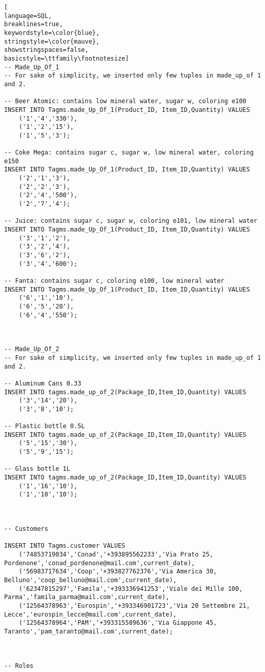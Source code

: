 \begin{lstlisting}[
language=SQL,
breaklines=true,
keywordstyle=\color{blue},
stringstyle=\color{mauve},
showstringspaces=false,
basicstyle=\ttfamily\footnotesize]
-- Made_Up_Of_1
-- For sake of simplicity, we inserted only few tuples in made_up_of 1 and 2.

-- Beer Atomic: contains low mineral water, sugar w, coloring e100
INSERT INTO Tagms.made_Up_Of_1(Product_ID, Item_ID,Quantity) VALUES
    ('1','4','330'),
    ('1','2','15'),
    ('1','5','3');

-- Coke Mega: contains sugar c, sugar w, low mineral water, coloring e150
INSERT INTO Tagms.made_Up_Of_1(Product_ID, Item_ID,Quantity) VALUES
    ('2','1','3'),
    ('2','2','3'),
    ('2','4','500'),
    ('2','7','4');

-- Juice: contains sugar c, sugar w, coloring e101, low mineral water
INSERT INTO Tagms.made_Up_Of_1(Product_ID, Item_ID,Quantity) VALUES
    ('3','1','2'),
    ('3','2','4'),
    ('3','6','2'),
    ('3','4','600');

-- Fanta: contains sugar c, coloring e100, low mineral water
INSERT INTO Tagms.made_Up_Of_1(Product_ID, Item_ID,Quantity) VALUES
    ('6','1','10'),
    ('6','5','20'),
    ('6','4','550');



-- Made_Up_Of_2
-- For sake of simplicity, we inserted only few tuples in made_up_of 1 and 2.

-- Aluminum Cans 0.33
INSERT INTO tagms.made_up_of_2(Package_ID,Item_ID,Quantity) VALUES
    ('3','14','20'),
    ('3','8','10');

-- Plastic bottle 0.5L
INSERT INTO tagms.made_up_of_2(Package_ID,Item_ID,Quantity) VALUES
    ('5','15','30'),
    ('5','9','15');

-- Glass bottle 1L
INSERT INTO tagms.made_up_of_2(Package_ID,Item_ID,Quantity) VALUES
    ('1','16','10'),
    ('1','10','10');



-- Customers

INSERT INTO Tagms.customer VALUES
    ('74853719034','Conad','+393895562233','Via Prato 25, Pordenone','conad_pordenone@mail.com',current_date),
    ('56983717634','Coop','+393827762376','Via America 30, Belluno','coop_belluno@mail.com',current_date),
    ('62347815297','Famila','+393336941253','Viale dei Mille 100, Parma','famila_parma@mail.com',current_date),
    ('12564378963','Eurospin','+393346901723','Via 20 Settembre 21, Lecce','eurospin_lecce@mail.com',current_date),
    ('12564378964','PAM','+393315589636','Via Giappone 45, Taranto','pam_taranto@mail.com',current_date);



-- Roles


\end{lstlisting}
